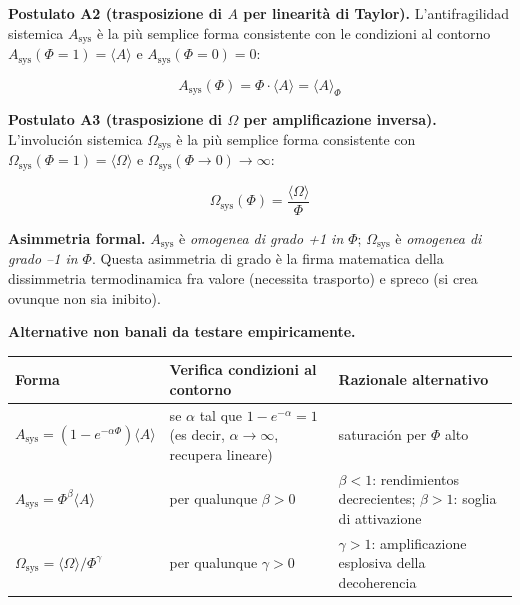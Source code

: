 \Hypoth{} \textbf{Postulato A2 (trasposizione di \(A\) per linearità di
Taylor).} L'antifragilidad sistemica \(A_{\text{sys}}\) è la più semplice
forma consistente con le condizioni al contorno
\(A_{\text{sys}}(\Phi=1) = \langle A\rangle\) e
\(A_{\text{sys}}(\Phi=0) = 0\):

\[
A_{\text{sys}}(\Phi) = \Phi \cdot \langle A \rangle = \langle A \rangle_\Phi
\]

\Hypoth{} \textbf{Postulato A3 (trasposizione di \(\Omega\) per
amplificazione inversa).} L'involución sistemica
\(\Omega_{\text{sys}}\) è la più semplice forma consistente con
\(\Omega_{\text{sys}}(\Phi=1) = \langle\Omega\rangle\) e
\(\Omega_{\text{sys}}(\Phi \to 0) \to \infty\):

\[
\Omega_{\text{sys}}(\Phi) = \frac{\langle \Omega \rangle}{\Phi}
\]

\Proved{} \textbf{Asimmetria formal.} \(A_{\text{sys}}\) è
\emph{omogenea di grado +1 in \(\Phi\)}; \(\Omega_{\text{sys}}\) è
\emph{omogenea di grado --1 in \(\Phi\)}. Questa asimmetria di grado è la
firma matematica della dissimmetria termodinamica fra valore (necessita
trasporto) e spreco (si crea ovunque non sia inibito).

\Conj{} \textbf{Alternative non banali da testare empiricamente.}

{\def\LTcaptype{none} %
{\small\begin{longtable}[]{@{}
  >{\raggedright\arraybackslash}p{}
  >{\raggedright\arraybackslash}p{}
  >{\raggedright\arraybackslash}p{}@{}}
\toprule\noalign{}
\begin{minipage}[b]{\linewidth}\raggedright
Forma
\end{minipage} & \begin{minipage}[b]{\linewidth}\raggedright
Verifica condizioni al contorno
\end{minipage} & \begin{minipage}[b]{\linewidth}\raggedright
Razionale alternativo
\end{minipage} \\
\midrule\noalign{}
\endhead
\bottomrule\noalign{}
\endlastfoot
\(A_{\text{sys}} = (1 - e^{-\alpha\Phi})\langle A\rangle\) & \Proved{}
se \(\alpha\) tal que \(1-e^{-\alpha} = 1\) (es decir,
\(\alpha \to \infty\), recupera lineare) & saturación per \(\Phi\)
alto \\
\(A_{\text{sys}} = \Phi^\beta \langle A\rangle\) & \Proved{} per
qualunque \(\beta > 0\) & \(\beta < 1\): rendimientos decrecientes;
\(\beta > 1\): soglia di attivazione \\
\(\Omega_{\text{sys}} = \langle\Omega\rangle / \Phi^\gamma\) & \Proved{}
per qualunque \(\gamma > 0\) & \(\gamma > 1\): amplificazione esplosiva
della decoherencia \\
\end{longtable}}
}

